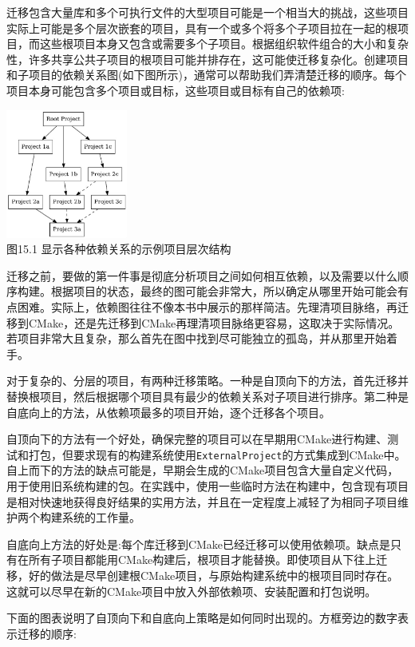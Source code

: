 
迁移包含大量库和多个可执行文件的大型项目可能是一个相当大的挑战，这些项目实际上可能是多个层次嵌套的项目，具有一个或多个将多个子项目拉在一起的根项目，而这些根项目本身又包含或需要多个子项目。根据组织软件组合的大小和复杂性，许多共享公共子项目的根项目可能并排存在，这可能使迁移复杂化。创建项目和子项目的依赖关系图(如下图所示)，通常可以帮助我们弄清楚迁移的顺序。每个项目本身可能包含多个项目或目标，这些项目或目标有自己的依赖项:

\begin{center}
\includegraphics[width=0.3\textwidth]{content/3/chapter15/images/1.jpg}\\
图15.1 显示各种依赖关系的示例项目层次结构
\end{center}

迁移之前，要做的第一件事是彻底分析项目之间如何相互依赖，以及需要以什么顺序构建。根据项目的状态，最终的图可能会非常大，所以确定从哪里开始可能会有点困难。实际上，依赖图往往不像本书中展示的那样简洁。先理清项目脉络，再迁移到CMake，还是先迁移到CMake再理清项目脉络更容易，这取决于实际情况。若项目非常大且复杂，那么首先在图中找到尽可能独立的孤岛，并从那里开始着手。

对于复杂的、分层的项目，有两种迁移策略。一种是自顶向下的方法，首先迁移并替换根项目，然后根据哪个项目具有最少的依赖关系对子项目进行排序。第二种是自底向上的方法，从依赖项最多的项目开始，逐个迁移各个项目。

自顶向下的方法有一个好处，确保完整的项目可以在早期用CMake进行构建、测试和打包，但要求现有的构建系统使用\texttt{ExternalProject}的方式集成到CMake中。自上而下的方法的缺点可能是，早期会生成的CMake项目包含大量自定义代码，用于使用旧系统构建的包。在实践中，使用一些临时方法在构建中，包含现有项目是相对快速地获得良好结果的实用方法，并且在一定程度上减轻了为相同子项目维护两个构建系统的工作量。

自底向上方法的好处是:每个库迁移到CMake已经迁移可以使用依赖项。缺点是只有在所有子项目都能用CMake构建后，根项目才能替换。即使项目从下往上迁移，好的做法是尽早创建根CMake项目，与原始构建系统中的根项目同时存在。这就可以尽早在新的CMake项目中放入外部依赖项、安装配置和打包说明。

下面的图表说明了自顶向下和自底向上策略是如何同时出现的。方框旁边的数字表示迁移的顺序:

